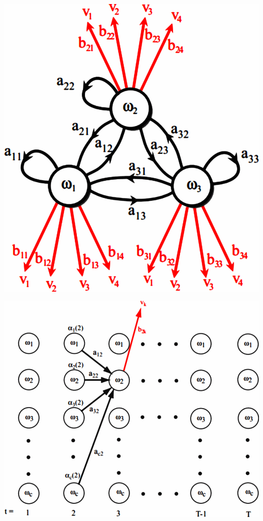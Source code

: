 \begin{minipage}{0.3\textwidth}
\includegraphics[width=1\linewidth]{./Content/Markov/hiddenMarkovModel.png}
\end{minipage}
\begin{minipage}{0.4\textwidth}
\includegraphics[width=1\linewidth]{./Content/Markov/hiddenMarkovModel2.png}
\end{minipage}
